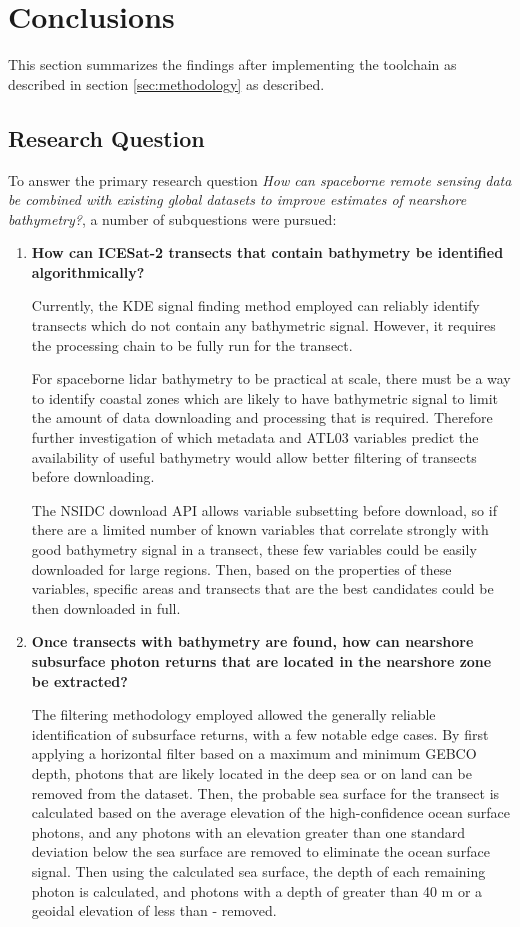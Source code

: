 \chapter{Conclusions}
This section summarizes the findings after implementing the toolchain as described in section \ref{sec:methodology} as described.

\section{Research Question}
To answer the primary research question \emph{How can spaceborne remote sensing data be combined with existing global datasets to improve estimates of nearshore bathymetry?}, a number of subquestions were pursued:

\begin{enumerate}
    \item \textbf{How can ICESat-2 transects that contain bathymetry be identified algorithmically?}

    Currently, the KDE signal finding method employed can reliably identify transects which do not contain any bathymetric signal. However, it requires the processing chain to be fully run for the transect. 
    
    For spaceborne lidar bathymetry to be practical at scale, there must be a way to identify coastal zones which are likely to have bathymetric signal to limit the amount of data downloading and processing that is required. Therefore further investigation of which metadata and ATL03 variables predict the availability of useful bathymetry would allow better filtering of transects before downloading. 
    
    The NSIDC download API allows variable subsetting before download, so if there are a limited number of known variables that correlate strongly with good bathymetry signal in a transect, these few variables could be easily downloaded for large regions.  
    Then, based on the properties of these variables, specific areas and transects that are the best candidates could be then downloaded in full.
    
    \item \textbf{Once transects with bathymetry are found, how can nearshore subsurface photon returns that are located in the nearshore zone be extracted?}
    
    The filtering methodology employed allowed the generally reliable identification of subsurface returns, with a few notable edge cases. By first applying a horizontal filter based on a maximum and minimum GEBCO depth, photons that are likely located in the deep sea or on land can be removed from the dataset. Then, the probable sea surface for the transect is calculated based on the average elevation of the high-confidence ocean surface photons, and any photons with an elevation greater than one standard deviation below the sea surface are removed to eliminate the ocean surface signal. Then using the calculated sea surface, the depth of each remaining photon is calculated, and photons with a depth of greater than 40 m or a geoidal elevation of less than - removed. 
    

\end{enumerate}

